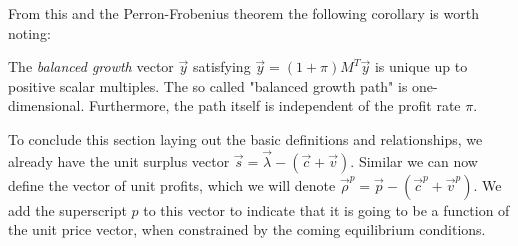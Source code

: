 From this and the Perron-Frobenius theorem the following corollary is worth noting:
\begin{corollary}
	The \emph{balanced growth} vector $\vec{y}$ satisfying $\vec{y} = (1+\pi)M^T\vec{y}$ is unique up to positive scalar multiples. The so called "balanced growth path" is one-dimensional.  Furthermore, the path itself is independent of the profit rate $\pi$. 
\end{corollary}
To conclude this section laying out the basic definitions and relationships, we already have the unit surplus vector $\vec{s} = \vec{\lambda} - (\vec{c}+\vec{v})$. Similar we can now define the vector of unit profits, which we will denote $\vec{\rho}^p = \vec{p} - (\vec{c}^p + \vec{v}^p)$. We add the superscript $p$ to this vector to indicate that it is going to be a function of the unit price vector, when constrained by the coming equilibrium conditions.


